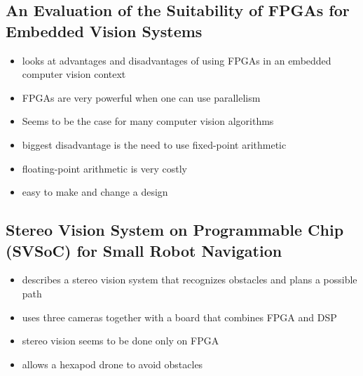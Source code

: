\subsection{An Evaluation of the Suitability of FPGAs for Embedded Vision Systems}
\begin{itemize}
	\item looks at advantages and disadvantages of using FPGAs in an embedded computer vision context
	\item FPGAs are very powerful when one can use parallelism
	\item Seems to be the case for many computer vision algorithms
	\item biggest disadvantage is the need to use fixed-point arithmetic
	\item floating-point arithmetic is very costly
	\item easy to make and change a design
\end{itemize}

\subsection{Stereo Vision System on Programmable Chip (SVSoC) for Small Robot Navigation}
\begin{itemize}
	\item describes a stereo vision system that recognizes obstacles and plans a possible path
	\item uses three cameras together with a board that combines FPGA and DSP
	\item stereo vision seems to be done only on FPGA
	\item allows a hexapod drone to avoid obstacles
\end{itemize}

